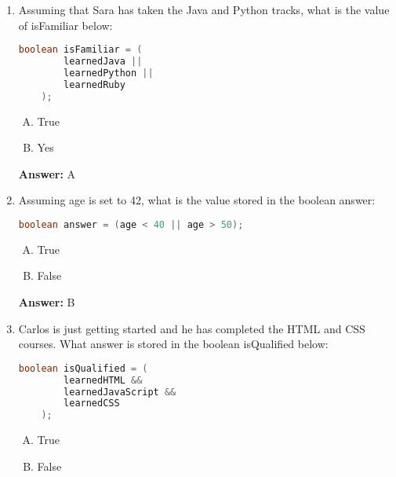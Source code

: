 \documentclass[12pt]{article}
\begin{document}
\begin{enumerate}[1.]
    \item

    Assuming that Sara has taken the Java and Python tracks, what is the value
    of isFamiliar below:

    \bigskip

    \begin{lstlisting}[language=Java]
    boolean isFamiliar = (
        learnedJava ||
        learnedPython ||
        learnedRuby
    );
    \end{lstlisting}

    \begin{enumerate}[A.]
        \item True
        \item Yes
    \end{enumerate}

    \bigskip

    \textbf{Answer:} A

    \item

    Assuming age is set to 42, what is the value stored in the boolean answer:

    \bigskip

    \begin{lstlisting}[language=Java]
    boolean answer = (age < 40 || age > 50);
    \end{lstlisting}

    \begin{enumerate}[A.]
        \item True
        \item False
    \end{enumerate}

    \bigskip

    \textbf{Answer:} B

    \item Carlos is just getting started and he has completed the HTML and CSS courses. What answer is stored in the
    boolean isQualified below:

    \bigskip

    \begin{lstlisting}[language=Java]
    boolean isQualified = (
        learnedHTML &&
        learnedJavaScript &&
        learnedCSS
    );
    \end{lstlisting}


    \begin{enumerate}[A.]
        \item True
        \item False
    \end{enumerate}


\end{enumerate}
\end{document}
